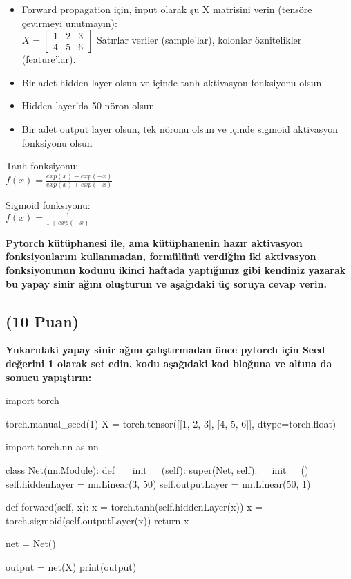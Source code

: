 \documentclass[11pt]{article}
\begin{document}
\begin{itemize}
    \item Forward propagation için, input olarak şu X matrisini verin (tensöre çevirmeyi unutmayın):\\
    $X = \begin{bmatrix}
        1 & 2 & 3\\
        4 & 5 & 6
        \end{bmatrix}$
    Satırlar veriler (sample'lar), kolonlar öznitelikler (feature'lar).
    \item Bir adet hidden layer olsun ve içinde tanh aktivasyon fonksiyonu olsun
    \item Hidden layer'da 50 nöron olsun
    \item Bir adet output layer olsun, tek nöronu olsun ve içinde sigmoid aktivasyon fonksiyonu olsun
\end{itemize}

Tanh fonksiyonu:\\
$f(x) = \frac{exp(x) - exp(-x)}{exp(x) + exp(-x)}$
\vspace{.2in}

Sigmoid fonksiyonu:\\
$f(x) = \frac{1}{1 + exp(-x)}$

\vspace{.2in}
 \textbf{Pytorch kütüphanesi ile, ama kütüphanenin hazır aktivasyon fonksiyonlarını kullanmadan, formülünü verdiğim iki aktivasyon fonksiyonunun kodunu ikinci haftada yaptığımız gibi kendiniz yazarak bu yapay sinir ağını oluşturun ve aşağıdaki üç soruya cevap verin.}
 
\subsection{(10 Puan)} \textbf{Yukarıdaki yapay sinir ağını çalıştırmadan önce pytorch için Seed değerini 1 olarak set edin, kodu aşağıdaki kod bloğuna ve altına da sonucu yapıştırın:}

\begin{python}
import torch

torch.manual_seed(1)  
X = torch.tensor([[1, 2, 3], [4, 5, 6]], dtype=torch.float)  

import torch.nn as nn

class Net(nn.Module):
    def __init__(self):
        super(Net, self).__init__()
        self.hiddenLayer = nn.Linear(3, 50)  
        self.outputLayer = nn.Linear(50, 1)  

    def forward(self, x):
        x = torch.tanh(self.hiddenLayer(x))  
        x = torch.sigmoid(self.outputLayer(x))  
        return x

net = Net()  

output = net(X)
print(output)
\end{python}
\end{document}
